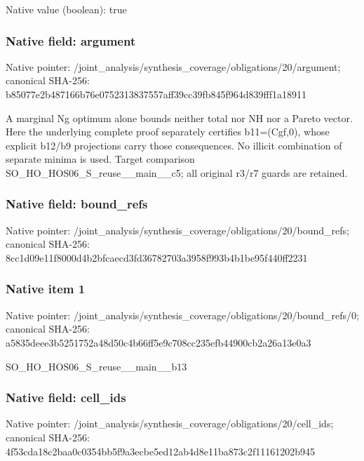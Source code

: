 \documentclass[10pt,a4paper]{article}
\begin{document}
Native value (boolean): true

\subsubsection{Native field: argument}
Native pointer: /joint\_\allowbreak{}analysis/synthesis\_\allowbreak{}coverage/obligations/20/argument; canonical SHA-256: b85077e2b487166b76e0752313837557aff39cc39fb845f964d839fff1a18911

\begingroup\raggedright\sloppy A marginal Ng optimum alone bounds neither total nor NH nor a Pareto vector. Here the underlying complete proof separately certifies b11=\allowbreak{}(Cgf,\allowbreak{}0),\allowbreak{} whose explicit b12/\allowbreak{}b9 projections carry those consequences. No illicit combination of separate minima is used. Target comparison SO\_\allowbreak{}HO\_\allowbreak{}HOS06\_\allowbreak{}S\_\allowbreak{}reuse\_\allowbreak{}\_\allowbreak{}main\_\allowbreak{}\_\allowbreak{}c5;\allowbreak{} all original r3/\allowbreak{}r7 guards are retained.\par\endgroup

\subsubsection{Native field: bound\_\allowbreak{}refs}
Native pointer: /joint\_\allowbreak{}analysis/synthesis\_\allowbreak{}coverage/obligations/20/bound\_\allowbreak{}refs; canonical SHA-256: 8cc1d09e11f8000d4b2bfcaecd3fd36782703a3958f993b4b1be95f440ff2231

\subsubsection{Native item 1}
Native pointer: /joint\_\allowbreak{}analysis/synthesis\_\allowbreak{}coverage/obligations/20/bound\_\allowbreak{}refs/0; canonical SHA-256: a5835deee3b5251752a48d50c4b66ff5e9c708cc235efb44900cb2a26a13e0a3

\begingroup\raggedright\sloppy SO\_\allowbreak{}HO\_\allowbreak{}HOS06\_\allowbreak{}S\_\allowbreak{}reuse\_\allowbreak{}\_\allowbreak{}main\_\allowbreak{}\_\allowbreak{}b13\par\endgroup

\subsubsection{Native field: cell\_\allowbreak{}ids}
Native pointer: /joint\_\allowbreak{}analysis/synthesis\_\allowbreak{}coverage/obligations/20/cell\_\allowbreak{}ids; canonical SHA-256: 4f53cda18c2baa0c0354bb5f9a3ecbe5ed12ab4d8e11ba873c2f11161202b945
\end{document}
